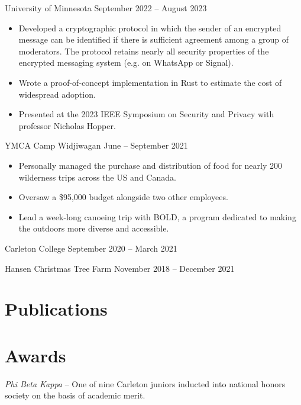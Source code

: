 \documentclass{ali-resume}
\begin{document}
{University of Minnesota}
{September 2022 -- August 2023}

\begin{itemize}
	\item
	      Developed a cryptographic protocol in which the sender of an encrypted message can be identified if there is sufficient agreement among a group of moderators.
	      The protocol retains nearly all security properties of the encrypted messaging system (e.g. on WhatsApp or Signal).
	\item Wrote a proof-of-concept implementation in Rust to estimate the cost of widespread adoption.
	\item Presented at the 2023 IEEE Symposium on Security and Privacy with professor Nicholas Hopper.
\end{itemize}

{YMCA Camp Widjiwagan}
{June -- September 2021}

\begin{itemize}
	\item Personally managed the purchase and distribution of food for nearly 200 wilderness trips across the US and Canada.
	\item Oversaw a \$95,000 budget alongside two other employees.
	\item Lead a week-long canoeing trip with BOLD, a program dedicated to making the outdoors more diverse and accessible.
\end{itemize}

{Carleton College}
{September 2020 -- March 2021}

{Hansen Christmas Tree Farm}
{November 2018 -- December 2021}

\null

\section{Publications}


\section{Awards}

\textit{Phi Beta Kappa} -- One of nine Carleton juniors inducted into national honors society on the basis of academic merit.
\end{document}
